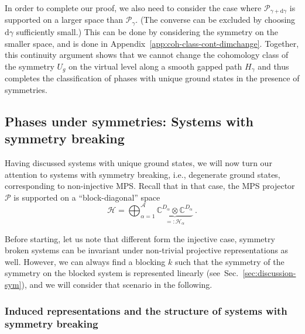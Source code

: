 \documentclass[twocolumn,superscriptaddress,prb,linenumbers]{revtex4-1}
\newcommand{\mc}[1]{\mathcal{#1}}
\newcommand{\dd}{\mathrm{d}}
\newcommand{\sss}[1]{\subsubsection{#1}}
\begin{document}
In order to complete our proof, we also need to consider the case where
$\mc P_{\gamma+\dd\gamma}$ is supported on a larger space than $\mc
    P_\gamma$.
(The converse can be excluded by choosing $\dd\gamma$ sufficiently small.)
This can be done by considering the symmetry on the smaller space, and is
done in Appendix~\ref{app:coh-class-cont-dimchange}. Together, this
continuity argument shows that we cannot change the cohomology class of
the symmetry $U_g$ on the virtual level along a smooth gapped path
$H_\gamma$ and thus completes the classification of phases with unique
ground states in the presence of symmetries.


\subsection{Phases under symmetries: Systems with symmetry breaking}

Having discussed systems with unique ground states, we will now turn our
attention to systems with symmetry breaking, i.e., degenerate ground
states, corresponding to non-injective MPS.  Recall that in that case, the
MPS projector $\mc P$ is supported on a ``block-diagonal'' space
\begin{equation}
    \label{eq:noninj:diagonalspace}
    \mc H=\bigoplus_{\alpha=1}^{\mc A}
    \underbrace{\mathbb C^{D_\alpha}\otimes \mathbb C^{D_\alpha}
    }_{\displaystyle =:\mc H_\alpha}\ .
\end{equation}

Before starting, let us note that different form the injective case,
symmetry broken systems can be invariant under non-trivial projective
representations as well. However, we can always find a blocking $k$ such
that the symmetry of the symmetry on the blocked system is represented
linearly (see~Sec.~\ref{sec:discussion-sym}), and we will consider that
scenario in the following.



\sss{Induced representations and the structure
    of systems with symmetry breaking}
\end{document}
